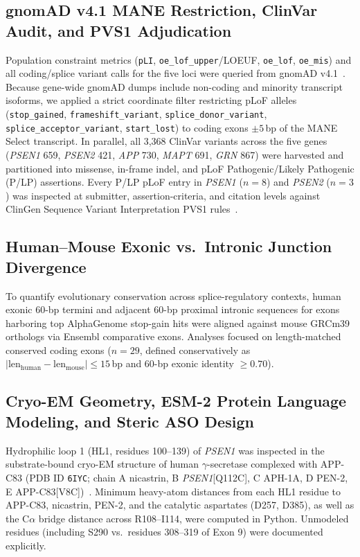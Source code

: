 \documentclass[11pt,a4paper]{article}
\begin{document}
\subsection{gnomAD v4.1 MANE Restriction, ClinVar Audit, and PVS1 Adjudication}
Population constraint metrics (\texttt{pLI}, \texttt{oe\_lof\_upper}/LOEUF, \texttt{oe\_lof}, \texttt{oe\_mis}) and all coding/splice variant calls for the five loci were queried from gnomAD v4.1~\cite{karczewski2020}. Because gene-wide gnomAD dumps include non-coding and minority transcript isoforms, we applied a strict coordinate filter restricting pLoF alleles (\texttt{stop\_gained}, \texttt{frameshift\_variant}, \texttt{splice\_donor\_variant}, \texttt{splice\_acceptor\_variant}, \texttt{start\_lost}) to coding exons $\pm 5$\,bp of the MANE Select transcript. In parallel, all 3,368 ClinVar variants across the five genes (\textit{PSEN1} 659, \textit{PSEN2} 421, \textit{APP} 730, \textit{MAPT} 691, \textit{GRN} 867) were harvested and partitioned into missense, in-frame indel, and pLoF Pathogenic/Likely Pathogenic (P/LP) assertions. Every P/LP pLoF entry in \textit{PSEN1} ($n=8$) and \textit{PSEN2} ($n=3$) was inspected at submitter, assertion-criteria, and citation levels against ClinGen Sequence Variant Interpretation PVS1 rules~\cite{richards2015,aboutayoun2018}.

\subsection{Human--Mouse Exonic vs.\ Intronic Junction Divergence}
To quantify evolutionary conservation across splice-regulatory contexts, human exonic 60-bp termini and adjacent 60-bp proximal intronic sequences for exons harboring top AlphaGenome stop-gain hits were aligned against mouse GRCm39 orthologs via Ensembl comparative exons. Analyses focused on length-matched conserved coding exons ($n=29$, defined conservatively as $|\text{len}_{\text{human}} - \text{len}_{\text{mouse}}| \leq 15$\,bp and 60-bp exonic identity $\geq 0.70$).

\subsection{Cryo-EM Geometry, ESM-2 Protein Language Modeling, and Steric ASO Design}
Hydrophilic loop 1 (HL1, residues 100--139) of \textit{PSEN1} was inspected in the substrate-bound cryo-EM structure of human $\gamma$-secretase complexed with APP-C83 (PDB ID \texttt{6IYC}; chain A nicastrin, B \textit{PSEN1}[Q112C], C APH-1A, D PEN-2, E APP-C83[V8C])~\cite{zhou2019}. Minimum heavy-atom distances from each HL1 residue to APP-C83, nicastrin, PEN-2, and the catalytic aspartates (D257, D385), as well as the C$\alpha$ bridge distance across R108--I114, were computed in Python. Unmodeled residues (including S290 vs.\ residues 308--319 of Exon 9) were documented explicitly.
\end{document}
